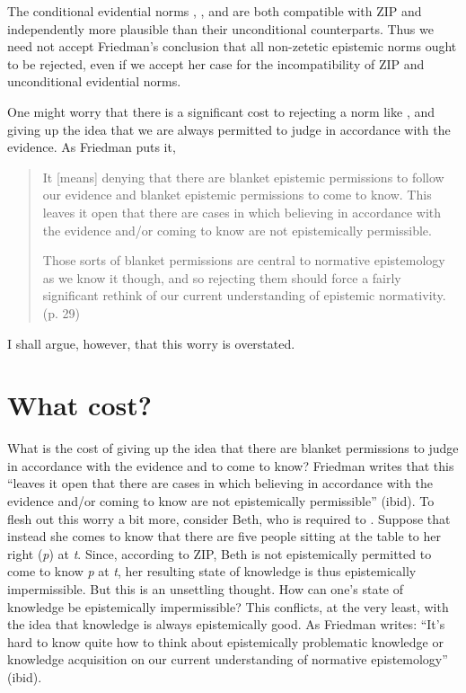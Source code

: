 \documentclass[12pt]{article}
\begin{document}
The conditional evidential norms \eoc{}, \soc{}, and \epc{} are both compatible with ZIP and independently more plausible than their unconditional counterparts. Thus we need not accept Friedman's conclusion that all non-zetetic epistemic norms ought to be rejected, even if we accept her case for the incompatibility of ZIP and unconditional evidential norms.

One might worry that there is a significant cost to rejecting a norm like \ep{}, and giving up the idea that we are always permitted to judge in accordance with the evidence. As Friedman puts it,

\begin{quote}
It [means] denying that there are blanket epistemic permissions to follow our evidence and blanket epistemic permissions to come to know. This leaves it open that there are cases in which believing in accordance with the evidence and/or coming to know are not epistemically permissible.

Those sorts of blanket permissions are central to normative epistemology as we know it though, and so rejecting them should force a fairly significant rethink of our current understanding of epistemic normativity. (p. 29)
\end{quote}
%
I shall argue, however, that this worry is overstated.

\section{What cost?}

What is the cost of giving up the idea that there are blanket permissions to judge in accordance with the evidence and to come to know? Friedman writes that this ``leaves it open that there are cases in which believing in accordance with the evidence and/or coming to know are not epistemically permissible'' (ibid). To flesh out this worry a bit more, consider Beth, who is required to \foc{}. Suppose that instead she comes to know that there are five people sitting at the table to her right (\textit{p}) at \textit{t}. Since, according to ZIP, Beth is not epistemically permitted to come to know \textit{p} at \textit{t}, her resulting state of knowledge is thus epistemically impermissible. But this is an unsettling thought. How can one's state of knowledge be epistemically impermissible? This conflicts, at the very least, with the idea that knowledge is always epistemically good. As Friedman writes: ``It’s hard to know quite how to think about epistemically problematic knowledge or knowledge acquisition on our current understanding of normative epistemology'' (ibid).
\end{document}
